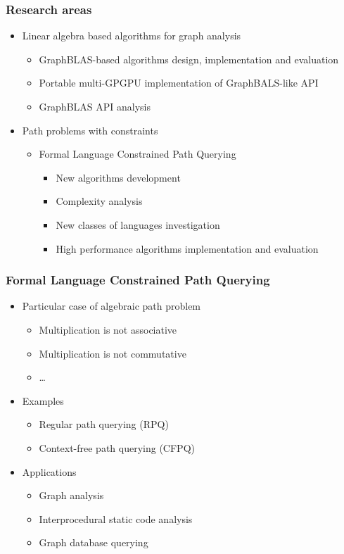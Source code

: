 \documentclass[xcolor=table,aspectratio=169]{beamer}
\begin{document}
\begin{frame}[fragile]
  \frametitle{Research areas}
  \begin{itemize}
    \item Linear algebra based algorithms for graph analysis
    \begin{itemize}
      \item GraphBLAS-based algorithms design, implementation and evaluation
      \item Portable multi-GPGPU implementation of GraphBALS-like API
      \item GraphBLAS API analysis
    \end{itemize} 
    \pause
    \item Path problems with constraints
    \begin{itemize}
      \item Formal Language Constrained Path Querying
      \begin{itemize}
        \item New algorithms development
        \item Complexity analysis
        \item New classes of languages investigation
        \item High performance algorithms implementation and evaluation 
      \end{itemize}
    \end{itemize}
  \end{itemize}
\end{frame}

\begin{frame}[fragile]
  \frametitle{Formal Language Constrained Path Querying}
    \begin{itemize}
      \item Particular case of algebraic path problem
      \begin{itemize}
        \item Multiplication is not associative
        \item Multiplication is not commutative
        \item \ldots
      \end{itemize}
      \pause
      \item Examples
      \begin {itemize}
        \item Regular path querying (RPQ)
        \item Context-free path querying (CFPQ)
      \end{itemize}
    \pause    
    \item Applications 
    \begin{itemize}
      \item Graph analysis
      \item Interprocedural static code analysis
      \item Graph database querying
    \end{itemize}    
  \end{itemize}
\end{frame}
\end{document}
